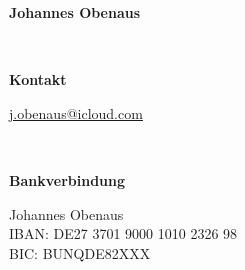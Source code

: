 \documentclass[
	a4paper, %
	10pt, %
]{CSMinimalInvoice}
\begin{document}

\begin{minipage}[t]{0.3\textwidth}
	\itshape %
	
	\textbf{Johannes Obenaus} %
	
\end{minipage}
\begin{minipage}[t]{0.03\textwidth}
	~ %
\end{minipage}
\begin{minipage}[t]{0.3\textwidth}
	\itshape %
	
	\textbf{Kontakt}
	
	\href{mailto:j.obenaus@icloud.com}{j.obenaus@icloud.com} \\
\end{minipage}
\begin{minipage}[t]{0.03\textwidth}
	~ %
\end{minipage}
\begin{minipage}[t]{0.4\textwidth}
	\itshape %
	
	\textbf{Bankverbindung}
	
	Johannes Obenaus \\ %
	IBAN: DE27 3701 9000 1010 2326 98 \\
	BIC: BUNQDE82XXX \\
\end{minipage}

\end{document}
